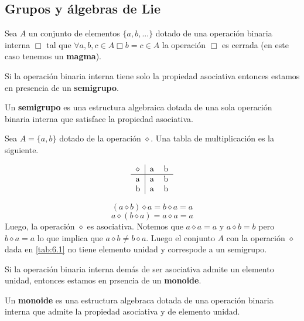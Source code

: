\subsection{Grupos y álgebras de Lie}
Sea $A$ un conjunto de elementos $\{a,b,...\}$ dotado de una operación binaria interna $\Box$ tal que $\forall a,b,c \in A \Box b=c\in A$ la operación $\Box$ es cerrada (en este caso tenemos un \textbf{magma}).

Si la operación binaria interna tiene solo la propiedad asociativa entonces estamos en presencia de un \textbf{semigrupo}.

\begin{defi}
	Un \textbf{semigrupo} es una estructura algebraica dotada de una sola operación binaria interna que satisface la propiedad asociativa.
\end{defi}
\begin{ej}
	Sea $A=\{a,b\}$ dotado de la operación $\diamond$. Una tabla de multiplicación es la siguiente.
	\begin{center}
	\begin{equation}\label{tab:6.1}
  \begin{tabular}{l|cc}
  $\diamond$& a & b\\
  \hline
  a&a &b \\
  b&a &b
\end{tabular}
\end{equation}
\end{center}
\begin{equation}
  (a\diamond b)\diamond a=b\diamond a=a
\end{equation}
\begin{equation}
  a\diamond (b\diamond a)=a\diamond a=a
\end{equation}
Luego, la operación $\diamond$ es asociativa.
Notemos que $a\diamond a=a$ y $a\diamond b=b$ pero $b\diamond a=a$ lo que implica que $a\diamond b\neq b\diamond a$. Luego el conjunto $A$ con la operación $\diamond$ dada en \eqref{tab:6.1} no tiene elemento unidad y correspode a un semigrupo.
\end{ej}

Si la operación binaria interna demás de ser asociativa admite un elemento unidad, entonces estamos en prsencia de un \textbf{monoide}.

\begin{defi}
	Un \textbf{monoide} es una estructura algebraca dotada de una operación binaria interna que admite la propiedad asociativa y de elemento unidad.
\end{defi}

